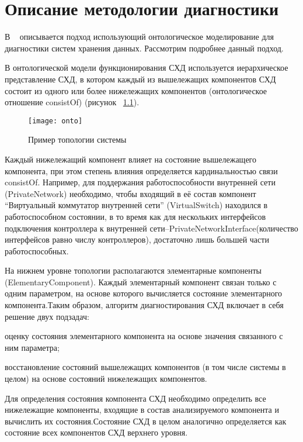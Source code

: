 \begingroup
\renewcommand{\cleardoublepage}{}
\renewcommand{\clearpage}{}
\vspace{1em}
\chapter{Описание методологии диагностики}
\endgroup
В ~\cite{ontoapproach} описывается подход использующий онтологическое моделирование для диагностики систем хранения данных. Рассмотрим подробнее данный подход. 

В  онтологической  модели  функционирования СХД используется иерархическое представление СХД, в котором каждый из вышележащих компонентов СХД состоит из одного или более нижележащих компонентов (онтологическое отношение consistOf) (рисунок ~\ref{fig:onto}).
\begin{figure}[h]
	\centering
	\texttt{[image: onto]}
	\caption{Пример топологии системы}
	\label{fig:onto}
\end{figure}

Каждый нижележащий компонент влияет на  состояние  вышележащего  компонента,  при  этом  степень  влияния определяется кардинальностью связи consistOf. Например, для поддержания работоспособности внутренней сети (PrivateNetwork) необходимо,  чтобы входящий  в  её  состав  компонент “Виртуальный коммутатор  внутренней  сети”  (VirtualSwitch)  находился  в  работоспособном состоянии,  в  то  время  как  для  нескольких  интерфейсов  подключения контроллера  к  внутренней  сети–PrivateNetworkInterface(количество интерфейсов  равно  числу  контроллеров),  достаточно  лишь  большей  части работоспособных.

На нижнем  уровне  топологии  располагаются  элементарные компоненты  (ElementaryComponent).  Каждый  элементарный  компонент связан  только  с  одним  параметром,  на  основе  которого вычисляется состояние элементарного компонента.Таким  образом,  алгоритм  диагностирования СХД включает  в  себя решение двух подзадач:
\begin{itemize*}
	\item{оценку состояния  элементарного  компонента  на  основе  значения связанного с ним параметра;}
	\item{восстановление состояний вышележащих компонентов (в том числе системы в целом) на основе состояний нижележащих компонентов.}
\end{itemize*}
Для определения состояния компонента СХД необходимо определить все  нижележащие  компоненты,  входящие  в  состав  анализируемого компонента и вычислить их состояния.Состояние СХД в целом аналогично определяется как состояние всех компонентов СХД верхнего уровня.

